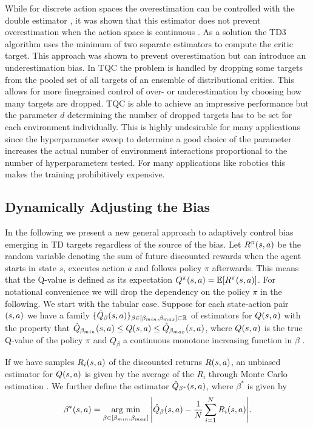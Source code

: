 While for discrete action spaces the overestimation can be controlled with the double estimator \cite{hasselt2016deepdouble,hasselt2010double}, it was shown that this estimator does not prevent overestimation when the action space is continuous \cite{td3}. 
As a solution the TD3 algorithm \cite{td3} uses the minimum of two separate estimators to compute the critic target. This approach was shown to prevent overestimation but can introduce an underestimation bias.
In TQC \cite{tqc} the problem is handled by dropping some targets from the pooled set of all targets of an ensemble of distributional critics. This allows for more finegrained control of over- or underestimation by choosing how many targets are dropped. 
TQC is able to achieve an impressive performance but the parameter $d$ determining the number of dropped targets has to be set for each environment individually. This is highly undesirable for many applications
since the hyperparameter sweep to determine a good choice of the parameter increases the actual number of environment interactions proportional to the number of hyperparameters tested. For many applications like robotics this makes the training prohibitively expensive. 






\subsection{Dynamically Adjusting the Bias}
In the following we present a new general approach to adaptively control bias emerging in TD targets regardless of the source of the bias.
Let $R^\pi (s, a)$ be the random variable denoting the sum of future discounted rewards when the agent starts in state $s$, executes action $a$ and follows policy $\pi$ afterwards. This means that the Q-value is defined as its expectation $Q^{\pi}(s, a) = \operatorname*{\mathbb{E}}[R^\pi (s, a)]$. For notational convenience we will drop the dependency on the policy $\pi$ in the following.
We start with the tabular case. Suppose for each state-action pair $(s, a)$ we have a family $\{\hat{Q}_\beta (s, a) \}_{\beta \in [\beta_{min} , \beta_{max}] \subset \mathbb{R}}$ of estimators for $Q(s, a)$ with the property that
$\hat{Q}_{\beta_{min}}(s,a) \leq Q(s, a) \leq  \hat{Q}_{\beta_{max}}(s,a)$, where $Q(s, a)$ is the true Q-value of the policy $\pi$ and $Q_\beta$ a continuous monotone increasing function in $\beta$ .


If we have samples $R_i (s, a)$ of the discounted returns $R (s, a)$, an unbiased estimator for $Q(s, a)$ is given by the average of the $R_i$ through Monte Carlo estimation \cite{introdrl2018}.
We further define the estimator $\hat{Q}_{\beta^*}(s, a)$, where $\beta^*$ is given by
\begin{equation}
    \beta^* (s, a) = \operatorname*{\arg\,min}_{\beta \in [\beta_{min}, \beta_{max}]} \Bigg| \hat{Q}_\beta (s, a) - \frac{1}{N} \sum_{i=1}^{N} R_i (s, a)  \Bigg| .
    \label{eq:optimal_q_estimator}
\end{equation}


